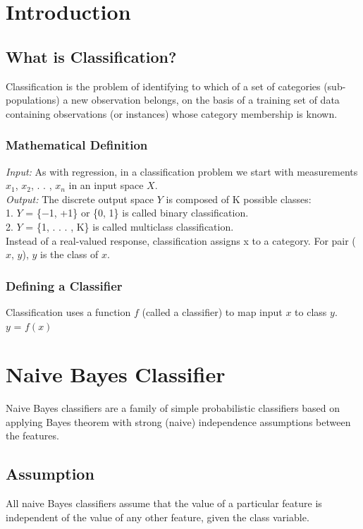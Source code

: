 
\section{Introduction}
\subsection{What is Classification?}

Classification is the problem of identifying to which of a set of categories (sub-populations) a new observation belongs, on the basis of a training set of data containing observations (or instances) whose category membership is known.

\subsubsection{Mathematical Definition}
{\itshape Input:} As with regression, in a classification problem we start with measurements {$x_1$, $x_2$, . . , $x_n$} in an input space $X$.
\\{\itshape Output:} The discrete output space $Y$ is composed of K possible classes:\\
1. $Y$ = \{−1, +1\} or \{0, 1\} is called binary classification.\\
2. $Y$ = \{1, . . . , K\} is called multiclass classification.\\
Instead of a real-valued response, classification assigns x to a category. For pair ($x$, $y$), $y$ is the class of $x$.

\subsubsection{Defining a Classifier}
Classification uses a function $f$ (called a classifier) to map input $x$ to class $y$.\\

    $y$ = $f(x)$

\section{Naive Bayes Classifier}
Naive Bayes classifiers are a family of simple probabilistic classifiers based on applying Bayes theorem with strong (naive) independence assumptions between the features.
\subsection{Assumption} All naive Bayes classifiers assume that the value of a particular feature is independent of the value of any other feature, given the class variable.
